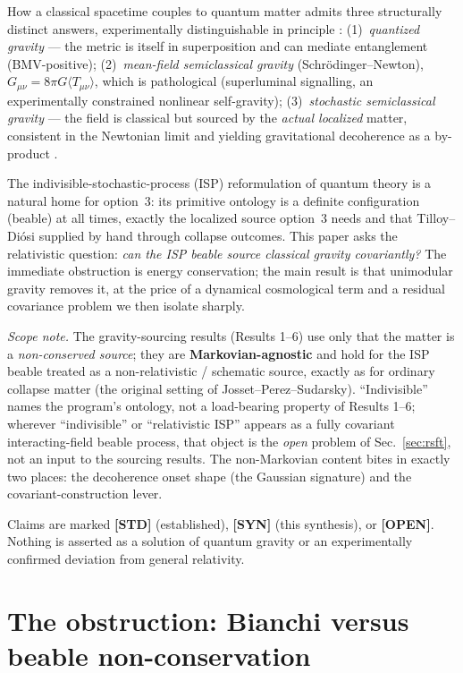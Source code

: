 \documentclass[aps,prd,preprint,amsmath,amssymb,nofootinbib,superscriptaddress]{revtex4-2}
\begin{document}
How a classical spacetime couples to quantum matter admits three structurally distinct
answers, experimentally distinguishable in principle
\cite{Bose2017,Marletto2017,Donadi2021}: (1)~\emph{quantized gravity} --- the metric is
itself in superposition and can mediate entanglement (BMV-positive);
(2)~\emph{mean-field semiclassical gravity} (Schr\"odinger--Newton),
$G_{\mu\nu}=8\pi G\langle T_{\mu\nu}\rangle$, which is pathological (superluminal
signalling, an experimentally constrained nonlinear self-gravity);
(3)~\emph{stochastic semiclassical gravity} --- the field is classical but sourced by the
\emph{actual localized} matter, consistent in the Newtonian limit and yielding gravitational
decoherence as a by-product \cite{TilloyDiosi2016}.

The indivisible-stochastic-process (ISP) reformulation of quantum theory
\cite{Barandes2023a,Barandes2023b} is a natural home for option~3: its primitive ontology
is a definite configuration (beable) at all times, exactly the localized source option~3
needs and that Tilloy--Di\'osi supplied by hand through collapse outcomes. This paper asks
the relativistic question: \emph{can the ISP beable source classical gravity covariantly?}
The immediate obstruction is energy conservation; the main result is that unimodular
gravity removes it, at the price of a dynamical cosmological term and a residual covariance
problem we then isolate sharply.

\emph{Scope note.} The gravity-sourcing results (Results 1--6) use only that the matter is a
\emph{non-conserved source}; they are \textbf{Markovian-agnostic} and hold for the ISP beable
treated as a non-relativistic / schematic source, exactly as for ordinary collapse matter (the
original setting of Josset--Perez--Sudarsky). ``Indivisible'' names the program's ontology, not
a load-bearing property of Results 1--6; wherever ``indivisible'' or ``relativistic ISP'' appears
as a fully covariant interacting-field beable process, that object is the \emph{open} problem of
Sec.~\ref{sec:rsft}, not an input to the sourcing results. The non-Markovian
content bites in exactly two places: the decoherence onset shape (the Gaussian signature) and the
covariant-construction lever.

Claims are marked \textbf{[STD]} (established), \textbf{[SYN]} (this synthesis), or
\textbf{[OPEN]}. Nothing is asserted as a solution of quantum gravity or an experimentally
confirmed deviation from general relativity.

\section{The obstruction: Bianchi versus beable non-conservation}
\end{document}
